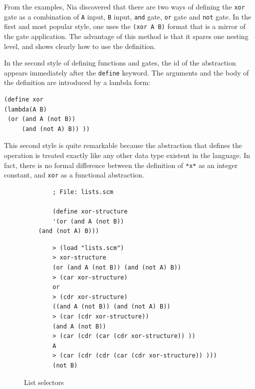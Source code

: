 \documentclass[a4paper,12pt]{book}
\newenvironment{fmpage}[1]
{\begin{lrbox}{\fmbox}\begin{minipage}{#1}}
{\end{minipage}\end{lrbox}\fbox{\usebox{\fmbox}}}
\begin{document}
From the examples, Nia discovered that there
are two ways of defining the \verb|xor| gate
as a combination of \verb|A| input, \verb|B| input,
\verb|and| gate, \verb|or| gate
and \verb|not| gate. In the first and
most popular style, one uses the
\verb|(xor A B)| format that is a mirror of
the gate application. The advantage of
this method is that it spares one
nesting level, and shows clearly how to use
the definition. 

In the second style of defining functions and
gates, the id of the abstraction 
appears immediately after the \verb|define|
keyword. The  arguments and the body of
the definition are introduced by a lambda form:
\label{page:lambda1}

\begin{verbatim}
(define xor
(lambda(A B)
 (or (and A (not B))
     (and (not A) B)) ))
\end{verbatim}

This second style is quite remarkable because
the abstraction that defines the operation
is treated exactly like any other
data type existent in the language.
In fact, there is no formal difference
between the definition of \verb|*x*|
as an integer constant, and \verb|xor|
as a functional abstraction.

\begin{figure}[!h]
	\begin{fmpage}{0.8\linewidth}
		\begin{verbatim}
		; File: lists.scm

		(define xor-structure
		'(or (and A (not B))
    (and (not A) B)))
		\end{verbatim}
	\end{fmpage}

	\begin{fmpage}{0.8\linewidth}
		\begin{verbatim}
		> (load "lists.scm")
		> xor-structure
		(or (and A (not B)) (and (not A) B))
		> (car xor-structure)
		or
		> (cdr xor-structure)
		((and A (not B)) (and (not A) B))
		> (car (cdr xor-structure))
		(and A (not B))
		> (car (cdr (car (cdr xor-structure)) ))
		A
		> (car (cdr (cdr (car (cdr xor-structure)) )))
		(not B)
		\end{verbatim}
	\end{fmpage}

	\begin{fmpage}{0.8\linewidth}
		\verb||
	\end{fmpage}
	\caption{List selectors}
	\label{fig:selectors}
\end{figure}
\end{document}
